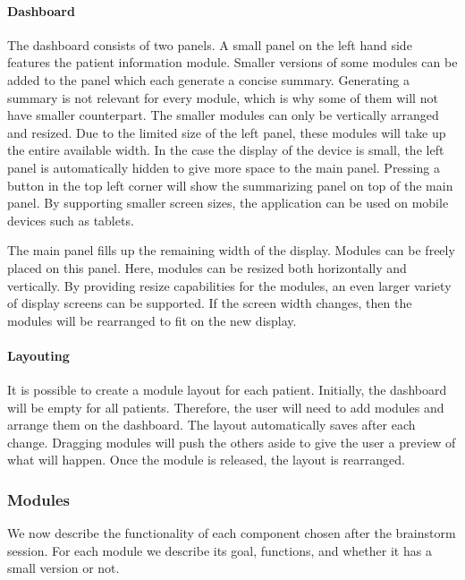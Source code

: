         \paragraph{Dashboard} The dashboard consists of two panels. A small panel on the left hand side features the patient information module. Smaller versions of some modules can be added to the panel which each generate a concise summary. Generating a summary is not relevant for every module, which is why some of them will not have smaller counterpart. The smaller modules can only be vertically arranged and resized. Due to the limited size of the left panel, these modules will take up the entire available width. In the case the display of the device is small, the left panel is automatically hidden to give more space to the main panel. Pressing a button in the top left corner will show the summarizing panel on top of the main panel. By supporting smaller screen sizes, the application can be used on mobile devices such as tablets.

        The main panel fills up the remaining width of the display. Modules can be freely placed on this panel. Here, modules can be resized both horizontally and vertically. By providing resize capabilities for the modules, an even larger variety of display screens can be supported. If the screen width changes, then the modules will be rearranged to fit on the new display.

        \paragraph{Layouting} It is possible to create a module layout for each patient. Initially, the dashboard will be empty for all patients. Therefore, the user will need to add modules and arrange them on the dashboard. The layout automatically saves after each change. Dragging modules will push the others aside to give the user a preview of what will happen. Once the module is released, the layout is rearranged.

        \subsubsection{Modules}\label{app_specification_modules}

        We now describe the functionality of each component chosen after the brainstorm session. For each module we describe its goal, functions, and whether it has a small version or not.

